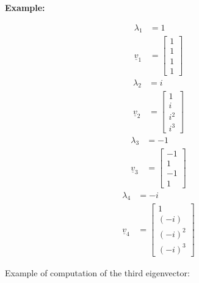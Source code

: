 \noindent \textbf{Example:}\\
\begin{multicols}{4}
    \[
        \begin{split}
            \lambda_1 &= 1\\
            \underline{v}_1 &= \begin{bmatrix}
                1\\
                1\\
                1\\
                1
            \end{bmatrix}    
        \end{split} 
    \]
    \[
        \begin{split}
            \lambda_2 &= i\\
            \underline{v}_2 &= \begin{bmatrix}
                1\\
                i\\
                i^2\\
                i^3
            \end{bmatrix}    
        \end{split} 
    \]
    \[
        \begin{split}
            \lambda_3 &= -1\\
            \underline{v}_3 &= \begin{bmatrix}
                -1\\
                1\\
                -1\\
                1
            \end{bmatrix}    
        \end{split} 
    \]
    \[
        \begin{split}
            \lambda_4 &= -i\\
            \underline{v}_4 &= \begin{bmatrix}
                1\\
                (-i)\\
                (-i)^2\\
                (-i)^3
            \end{bmatrix}    
        \end{split} 
    \]
\end{multicols}    
Example of computation of the third eigenvector:
